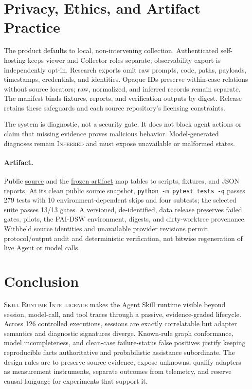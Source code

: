 \documentclass[runningheads]{llncs}
\newcommand{\system}{\textsc{Skill Runtime Intelligence}\xspace}
\newcommand{\inferred}{\textsc{Inferred}\xspace}
\begin{document}
\section{Privacy, Ethics, and Artifact Practice}

The product defaults to local, non-intervening collection. Authenticated
self-hosting keeps viewer and Collector roles separate; observability export is
independently opt-in. Research exports omit raw prompts, code, paths, payloads,
timestamps, credentials, and identities. Opaque IDs preserve within-case
relations without source locators; raw, normalized, and inferred records remain
separate. The manifest binds fixtures, reports, and verification outputs by
digest. Release retains these safeguards and each source repository's licensing
constraints.

The system is diagnostic, not a security gate.  It does not block agent actions
or claim that missing evidence proves malicious behavior.  Model-generated
diagnoses remain \inferred and must expose unavailable or malformed states.

\paragraph{Artifact.}
Public \href{https://github.com/hellogxp/skill-runtime-intelligence}{source} and the
\href{https://github.com/hellogxp/skill-runtime-intelligence-supplementary/releases/tag/profes-2026-submission-v1}{frozen artifact}
map tables to scripts, fixtures, and JSON reports.
At its clean public source snapshot, \texttt{python -m pytest tests -q} passes
279 tests with 10 environment-dependent skips and four subtests; the selected
suite passes 13/13 gates. A versioned, de-identified,
\href{https://github.com/hellogxp/skill-runtime-intelligence/releases/tag/profes-2026-artifact-v2}{data release}
preserves failed gates, pilots, the PAI-DSW environment, digests, and
dirty-worktree provenance. Withheld source identities and unavailable provider
revisions permit protocol/output audit and deterministic verification, not
bitwise regeneration of live Agent or model calls.

\section{Conclusion}

\system makes the Agent Skill runtime visible beyond session, model-call, and
tool traces through a passive, evidence-graded lifecycle. Across 126 controlled
executions, sessions are exactly correlatable but adapter semantics and
diagnostic signatures diverge. Known-rule graph conformance, model
incompleteness, and clean-case failure-status false positives justify keeping
reproducible facts authoritative and probabilistic assistance subordinate. The
design rules are to preserve source evidence, expose unknowns, qualify adapters
as measurement instruments, separate outcomes from telemetry, and reserve
causal language for experiments that support it.



\end{document}
